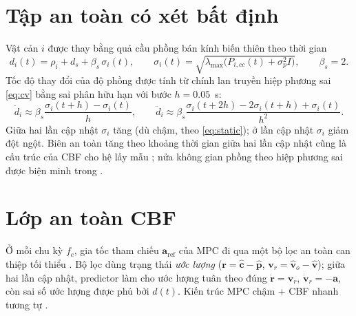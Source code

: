 \documentclass[11pt,a4paper]{article}
\numberwithin{equation}{section}
\newcommand{\vb}[1]{\bm{#1}}
\newcommand{\lmax}{\lambda_{\max}}
\theoremstyle{definition}
\theoremstyle{plain}
\theoremstyle{remark}
\begin{document}
\section{Tập an toàn có xét bất định}
\label{sec:deff}
Vật cản $i$ được thay bằng quả cầu phồng bán kính biến thiên theo thời gian
\begin{equation}
d_i(t)=\rho_i+d_s+\beta_s\,\sigma_i(t),\qquad \sigma_i(t)=\sqrt{\lmax\big(P_{i,cc}(t)+\sigma_p^2I\big)},\qquad \beta_s=2. \label{eq:deff}
\end{equation}
Tốc độ thay đổi của độ phồng được tính từ chính lan truyền hiệp phương sai \eqref{eq:cv} bằng sai phân hữu hạn với bước $h=0.05$~s:
\begin{equation}
\dot d_i\approx\beta_s\frac{\sigma_i(t+h)-\sigma_i(t)}{h},\qquad
\ddot d_i\approx\beta_s\frac{\sigma_i(t+2h)-2\sigma_i(t+h)+\sigma_i(t)}{h^2}. \label{eq:ddot}
\end{equation}
Giữa hai lần cập nhật $\sigma_i$ tăng (dù chậm, theo \eqref{eq:static}); ở lần cập nhật $\sigma_i$ giảm đột ngột. Biên an toàn tăng theo khoảng thời gian giữa hai lần cập nhật cũng là cấu trúc của CBF cho hệ lấy mẫu \cite{breeden2022sampled}; nửa không gian phồng theo hiệp phương sai được biện minh trong \cite{zhu2019chance,lin2026stochastic}.

\section{Lớp an toàn CBF}
\label{sec:cbf}
Ở mỗi chu kỳ $f_c$, gia tốc tham chiếu $\vb a_{\text{ref}}$ của MPC đi qua một bộ lọc an toàn can thiệp tối thiểu \cite{ames2017cbf,ames2019cbf}. Bộ lọc dùng trạng thái \emph{ước lượng} ($\vb r=\hat{\vb c}-\hat{\vb p}$, $\vb v_r=\hat{\vb v}_o-\hat{\vb v}$); giữa hai lần cập nhật, predictor làm cho ước lượng tuân theo đúng $\dot{\vb r}=\vb v_r$, $\dot{\vb v}_r=-\vb a$, còn sai số ước lượng được phủ bởi $d(t)$. Kiến trúc MPC chậm + CBF nhanh tương tự \cite{rosolia2020multirate}.
\end{document}
